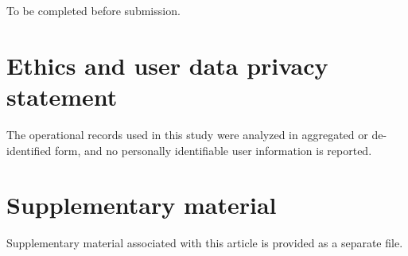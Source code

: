 \documentclass[12pt]{article}
\begin{document}
To be completed before submission.

\section*{Ethics and user data privacy statement}

The operational records used in this study were analyzed in aggregated or de-identified form, and no personally identifiable user information is reported.

\section*{Supplementary material}

Supplementary material associated with this article is provided as a separate file.



\end{document}
